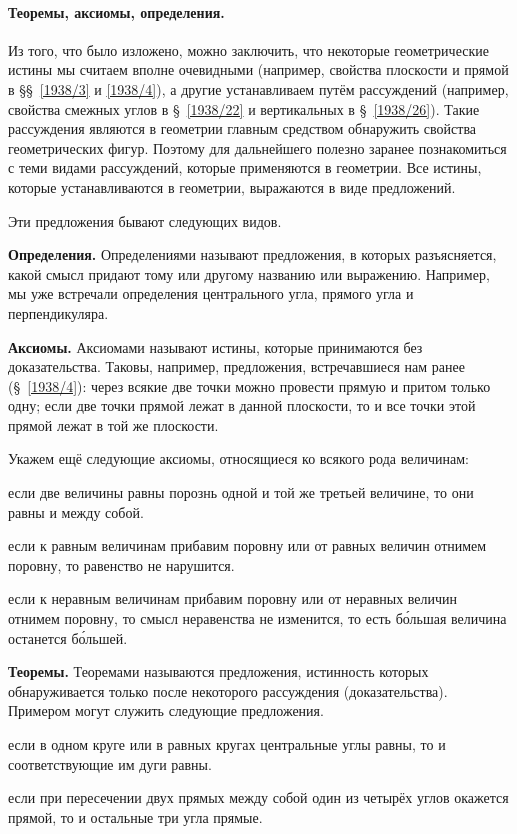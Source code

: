 \documentclass[twoside]{book}
\begin{document}
\paragraph{Теоремы, аксиомы, определения.}\label{1938/28}
Из того, что было изложено, можно заключить, что некоторые геометрические истины мы считаем вполне очевидными (например, свойства плоскости и прямой в §§~\ref{1938/3} и \ref{1938/4}), а другие устанавливаем путём рассуждений (например, свойства смежных углов в §~\ref{1938/22} и вертикальных в §~\ref{1938/26}).
Такие рассуждения являются в геометрии главным средством обнаружить свойства геометрических фигур.
Поэтому для дальнейшего полезно заранее познакомиться с теми видами рассуждений, которые применяются в геометрии.
Все истины, которые устанавливаются в геометрии, выражаются в виде предложений.

Эти предложения бывают следующих видов.

\textbf{Определения.}
Определениями называют предложения, в которых разъясняется, какой смысл придают тому или другому названию или выражению.
Например, мы уже встречали определения центрального угла, прямого угла и перпендикуляра.

\textbf{Аксиомы.}
Аксиомами называют истины, которые принимаются без доказательства.
Таковы, например, предложения, встречавшиеся нам ранее (§~\ref{1938/4}):
через всякие две точки можно провести прямую и притом только одну;
если две точки прямой лежат в данной плоскости, то и все точки этой прямой лежат в той же плоскости.

Укажем ещё следующие аксиомы, относящиеся ко всякого рода величинам:

если две величины равны порознь одной и той же третьей величине, то они равны и между собой.

если к равным величинам прибавим поровну или от равных величин отнимем поровну, то равенство не нарушится.

если к неравным величинам прибавим поровну или от неравных величин отнимем поровну, то смысл неравенства не изменится, то есть б\'{о}льшая величина останется б\'{о}льшей.

\textbf{Теоремы.}
Теоремами называются предложения, истинность которых обнаруживается только после некоторого рассуждения (доказательства).
Примером могут служить следующие предложения.

если в одном круге или в равных кругах центральные углы равны, то и соответствующие им дуги равны.

если при пересечении двух прямых между собой один из четырёх углов окажется прямой, то и остальные три угла прямые.
\end{document}
